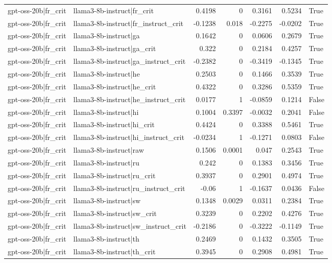 \begin{table}
\begin{tabular}{l l r r r r l}
gpt-oss-20b|fr_crit & llama3-8b-instruct|fr_crit & 0.4198 & 0 & 0.3161 & 0.5234 & True \\
gpt-oss-20b|fr_crit & llama3-8b-instruct|fr_instruct_crit & -0.1238 & 0.018 & -0.2275 & -0.0202 & True \\
gpt-oss-20b|fr_crit & llama3-8b-instruct|ga & 0.1642 & 0 & 0.0606 & 0.2679 & True \\
gpt-oss-20b|fr_crit & llama3-8b-instruct|ga_crit & 0.322 & 0 & 0.2184 & 0.4257 & True \\
gpt-oss-20b|fr_crit & llama3-8b-instruct|ga_instruct_crit & -0.2382 & 0 & -0.3419 & -0.1345 & True \\
gpt-oss-20b|fr_crit & llama3-8b-instruct|he & 0.2503 & 0 & 0.1466 & 0.3539 & True \\
gpt-oss-20b|fr_crit & llama3-8b-instruct|he_crit & 0.4322 & 0 & 0.3286 & 0.5359 & True \\
gpt-oss-20b|fr_crit & llama3-8b-instruct|he_instruct_crit & 0.0177 & 1 & -0.0859 & 0.1214 & False \\
gpt-oss-20b|fr_crit & llama3-8b-instruct|hi & 0.1004 & 0.3397 & -0.0032 & 0.2041 & False \\
gpt-oss-20b|fr_crit & llama3-8b-instruct|hi_crit & 0.4424 & 0 & 0.3388 & 0.5461 & True \\
gpt-oss-20b|fr_crit & llama3-8b-instruct|hi_instruct_crit & -0.0234 & 1 & -0.1271 & 0.0803 & False \\
gpt-oss-20b|fr_crit & llama3-8b-instruct|raw & 0.1506 & 0.0001 & 0.047 & 0.2543 & True \\
gpt-oss-20b|fr_crit & llama3-8b-instruct|ru & 0.242 & 0 & 0.1383 & 0.3456 & True \\
gpt-oss-20b|fr_crit & llama3-8b-instruct|ru_crit & 0.3937 & 0 & 0.2901 & 0.4974 & True \\
gpt-oss-20b|fr_crit & llama3-8b-instruct|ru_instruct_crit & -0.06 & 1 & -0.1637 & 0.0436 & False \\
gpt-oss-20b|fr_crit & llama3-8b-instruct|sw & 0.1348 & 0.0029 & 0.0311 & 0.2384 & True \\
gpt-oss-20b|fr_crit & llama3-8b-instruct|sw_crit & 0.3239 & 0 & 0.2202 & 0.4276 & True \\
gpt-oss-20b|fr_crit & llama3-8b-instruct|sw_instruct_crit & -0.2186 & 0 & -0.3222 & -0.1149 & True \\
gpt-oss-20b|fr_crit & llama3-8b-instruct|th & 0.2469 & 0 & 0.1432 & 0.3505 & True \\
gpt-oss-20b|fr_crit & llama3-8b-instruct|th_crit & 0.3945 & 0 & 0.2908 & 0.4981 & True \\

\end{tabular}
\end{table}

